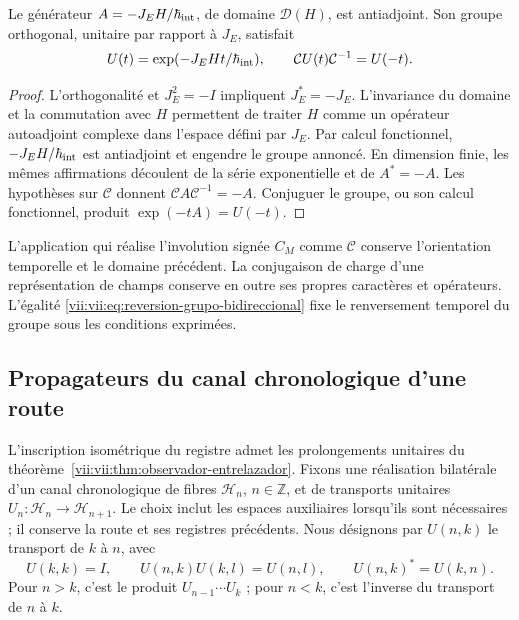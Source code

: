 \begin{theorem}
\label{vii:vii:thm:reversion-evolucion}
Le générateur \(A=-J_EH/\hbar_{\rm int}\), de domaine \(\mathcal D(H)\),
est antiadjoint. Son groupe orthogonal, unitaire par rapport à \(J_E\), satisfait
\begin{equation}
 U(t)=\exp(-J_EHt/\hbar_{\rm int}),\qquad
 \mathcal C U(t)\mathcal C^{-1}=U(-t).
 \label{vii:vii:eq:reversion-grupo-bidireccional}
\end{equation}
\end{theorem}
\begin{proof}
L'orthogonalité et \(J_E^2=-I\) impliquent \(J_E^*=-J_E\).
L'invariance du domaine et la commutation avec \(H\) permettent de traiter
\(H\) comme un opérateur autoadjoint complexe dans l'espace défini par
\(J_E\). Par calcul fonctionnel, \(-J_EH/\hbar_{\rm int}\) est
antiadjoint et engendre le groupe annoncé. En dimension finie, les mêmes
affirmations découlent de la série exponentielle et de \(A^*=-A\).
Les hypothèses sur \(\mathcal C\) donnent
\(\mathcal C A\mathcal C^{-1}=-A\). Conjuguer le groupe, ou son calcul
fonctionnel, produit \(\exp(-tA)=U(-t)\).
\end{proof}

L'application qui réalise l'involution signée \(C_M\) comme \(\mathcal C\)
conserve l'orientation temporelle et le domaine précédent. La conjugaison de
charge d'une représentation de champs conserve en outre ses propres
caractères et opérateurs. L'égalité
\eqref{vii:vii:eq:reversion-grupo-bidireccional} fixe le renversement temporel
du groupe sous les conditions exprimées.

\subsection{Propagateurs du canal chronologique d'une route}
\label{vii:vii:subsec:green-cronologico}

L'inscription isométrique du registre admet les prolongements unitaires du théorème~\ref{vii:vii:thm:observador-entrelazador}. Fixons une réalisation bilatérale d'un canal chronologique de fibres \(\mathcal H_n\), \(n\in\mathbb Z\), et de transports unitaires \(U_n:\mathcal H_n\to\mathcal H_{n+1}\). Le choix inclut les espaces auxiliaires lorsqu'ils sont nécessaires ; il conserve la route et ses registres précédents. Nous désignons par \(U(n,k)\) le transport de \(k\) à \(n\), avec
\[
 U(k,k)=I,\qquad U(n,k)U(k,l)=U(n,l),\qquad
 U(n,k)^*=U(k,n).
\]
Pour \(n>k\), c'est le produit \(U_{n-1}\cdots U_k\) ; pour \(n<k\),
c'est l'inverse du transport de \(n\) à \(k\).

